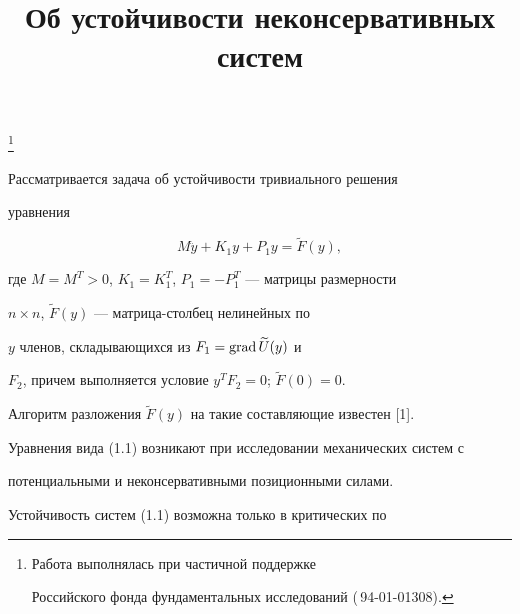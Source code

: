 

\title{Об устойчивости неконсервативных систем}





\thanks{Работа выполнялась при частичной поддержке


Российского фонда фундаментальных исследований (\No\,94-01-01308).}


\date{}







\pagestyle{plain} %













\maketitle





Рассматривается задача об устойчивости тривиального решения


уравнения


\begin{equation}


M\ddot y + K_{1}y+P_{1}y=\widetilde{F}(y), \tag{1.1}


\end{equation}


где $M=M^{T}>0$, $K_{1}=K_{1}^{T}$, $P_{1}=-P_{1}^{T}$ --- матрицы размерности


$n \times n$, $\widetilde{F}(y)$ --- матрица-столбец нелинейных по


$y$ членов, складывающихся из $F_{1}=\operatorname{grad}\widetilde{U}(y)$ и


$F_{2}$, причем выполняется условие $y^{T}F_{2}=0$; $\widetilde{F}(0)=0$.


Алгоритм разложения $\widetilde{F}(y)$ на такие составляющие известен [1].


Уравнения вида (1.1) возникают при исследовании механических систем с


потенциальными и неконсервативными позиционными силами.


Устойчивость систем (1.1) возможна только в критических по


